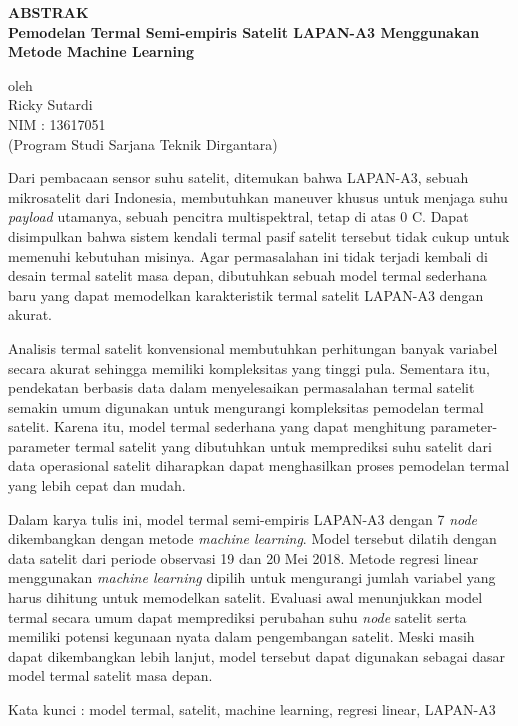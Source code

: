 \begin{center}
       \Large
       \textbf{ABSTRAK} \\
        \vspace{1.5cm}
        \large
        \textbf{Pemodelan Termal Semi-empiris Satelit LAPAN-A3 Menggunakan Metode Machine Learning}\\
        
        \vspace{1.5cm}
        
        oleh\\
        Ricky Sutardi\\
        NIM : 13617051\\
        (Program Studi Sarjana Teknik Dirgantara)\\
        \vspace{1.5cm}
\end{center}

Dari pembacaan sensor suhu satelit, ditemukan bahwa LAPAN-A3, sebuah
mikrosatelit dari Indonesia, membutuhkan maneuver khusus untuk menjaga suhu
\textit{payload} utamanya, sebuah pencitra multispektral, tetap di atas 0
\degree C. Dapat disimpulkan bahwa sistem kendali termal pasif satelit tersebut
tidak cukup untuk memenuhi kebutuhan misinya. Agar permasalahan ini tidak
terjadi kembali di desain termal satelit masa depan, dibutuhkan sebuah model
termal sederhana baru yang dapat memodelkan karakteristik termal satelit
LAPAN-A3 dengan akurat.

Analisis termal satelit konvensional membutuhkan perhitungan banyak variabel
secara akurat sehingga memiliki kompleksitas yang tinggi pula. Sementara itu,
pendekatan berbasis data dalam menyelesaikan permasalahan termal
satelit semakin umum digunakan untuk mengurangi kompleksitas pemodelan termal
satelit. Karena itu, model termal sederhana yang dapat menghitung
parameter-parameter termal satelit yang dibutuhkan untuk memprediksi suhu
satelit dari data operasional satelit diharapkan dapat menghasilkan proses
pemodelan termal yang lebih cepat dan mudah.

Dalam karya tulis ini, model termal semi-empiris LAPAN-A3 dengan 7
\textit{node} dikembangkan dengan metode \textit{machine learning}. Model
tersebut dilatih dengan data satelit dari periode observasi 19 dan 20 Mei 2018.
Metode regresi linear menggunakan \textit{machine learning} dipilih untuk
mengurangi jumlah variabel yang harus dihitung untuk memodelkan satelit.
Evaluasi awal menunjukkan model termal secara umum dapat memprediksi perubahan
suhu \textit{node} satelit serta memiliki potensi kegunaan nyata dalam
pengembangan satelit. Meski masih dapat dikembangkan lebih lanjut, model
tersebut dapat digunakan sebagai dasar model termal satelit masa depan. 

\vspace{1.0cm}
\noindent 
Kata kunci : model termal, satelit, machine learning, regresi linear, LAPAN-A3
